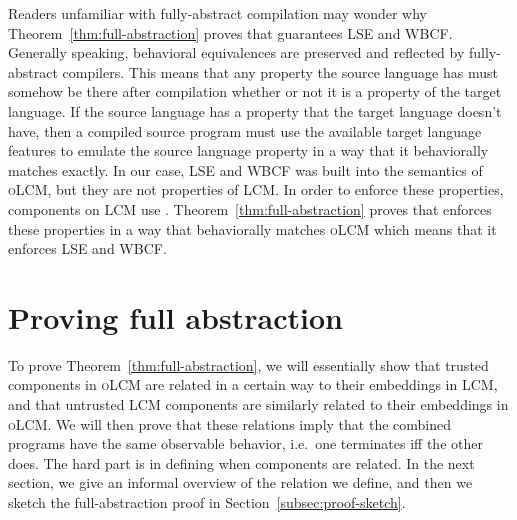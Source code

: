 \documentclass[acmsmall,review,showframe]{acmart}\settopmatter{printfolios=true,printccs=false,printacmref=false}
\newcommand{\trgcm}{\textsc{LCM}}
\newcommand{\srccm}{\textsc{oLCM}}
\begin{document}
Readers unfamiliar with fully-abstract compilation may wonder why Theorem~\ref{thm:full-abstraction} proves that \stktokens{} guarantees LSE and WBCF.
Generally speaking, behavioral equivalences are preserved and reflected by fully-abstract compilers.
This means that any property the source language has must somehow be there after compilation whether or not it is a property of the target language.
If the source language has a property that the target language doesn't have, then a compiled source program must use the available target language features to emulate the source language property in a way that it behaviorally matches exactly.
In our case, LSE and WBCF was built into the semantics of \srccm{}, but they are not properties of \trgcm{}.
In order to enforce these properties, components on \trgcm{} use \stktokens{}.
Theorem~\ref{thm:full-abstraction} proves that \stktokens{} enforces these properties in a way that behaviorally matches \srccm{} which means that it enforces LSE and WBCF.




\section{Proving full abstraction}
\label{sec:fa-proof}
To prove Theorem~\ref{thm:full-abstraction}, we will essentially show that trusted components in \srccm{} are related in a certain way to their embeddings in \trgcm{}, and that untrusted \trgcm{} components are similarly related to their embeddings in \srccm{}.
We will then prove that these relations imply that the combined programs have the same observable behavior, i.e.\ one terminates iff the other does.
The hard part is in defining when components are related.
In the next section, we give an informal overview of the relation we define, and then we sketch the full-abstraction proof in Section~\ref{subsec:proof-sketch}.
\end{document}
